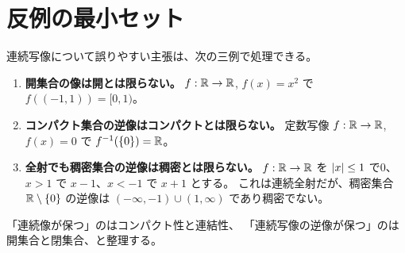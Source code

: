 \section{反例の最小セット}

連続写像について誤りやすい主張は、次の三例で処理できる。
\begin{enumerate}
  \item \textbf{開集合の像は開とは限らない。}
        $f:\mathbb{R}\to\mathbb{R}$, $f(x)=x^2$ で $f((-1,1))=[0,1)$。
  \item \textbf{コンパクト集合の逆像はコンパクトとは限らない。}
        定数写像 $f:\mathbb{R}\to\mathbb{R}$, $f(x)=0$ で $f^{-1}(\{0\})=\mathbb{R}$。
  \item \textbf{全射でも稠密集合の逆像は稠密とは限らない。}
        $f:\mathbb{R}\to\mathbb{R}$ を $\lvert x \rvert\le1$ で0、$x>1$ で $x-1$、$x<-1$ で $x+1$ とする。
        これは連続全射だが、稠密集合 $\mathbb{R}\setminus\{0\}$ の逆像は
        $(-\infty,-1)\cup(1,\infty)$ であり稠密でない。
\end{enumerate}

「連続像が保つ」のはコンパクト性と連結性、
「連続写像の逆像が保つ」のは開集合と閉集合、と整理する。
